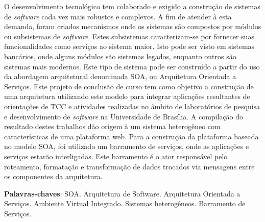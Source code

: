 \begin{resumo}

O desenvolvimento tecnológico tem colaborado e exigido a construção de sistemas de \textit{software} cada vez mais robustos e complexos. A fim de atender à esta demanda, foram criados mecanismos onde os sistemas são compostos por módulos ou subsistemas de \textit{software}. Estes subsistemas caracterizam-se por fornecer suas funcionalidades como serviços ao sistema maior. Isto pode ser visto em sistemas bancários, onde alguns módulos são sistemas legados, enquanto outros são sistemas mais modernos. Este tipo de sistema pode ser construído a partir do uso da abordagem arquitetural denominada SOA, ou Arquitetura Orientada a Serviços. Este projeto de conclusão de curso tem como objetivo a construção de uma arquitetura utilizando este modelo para integrar aplicações resultantes de orientações de TCC e atividades realizadas no âmbito de laboratórios de pesquisa e desenvolvimento de \textit{software} na Universidade de Brasília. A compilação do resultado destes trabalhos dão origem à um sistema heterogêneo com características de uma plataforma web. Para a construção da plataforma baseada no modelo SOA, foi utilizado um barramento de serviços, onde as aplicações e serviços estarão interligadas. Este barramento é o ator responsável pelo roteamento, formatação e transformação de dados trocados via mensagens entre os componentes da arquitetura.

 \vspace{\onelineskip}
    
 \noindent
 \textbf{Palavras-chaves}: SOA. Arquitetura de Software. Arquitetura Orientada a Serviços. Ambiente Virtual Integrado. Sistemas heterogêneos. Barramento de Serviços.
\end{resumo}
